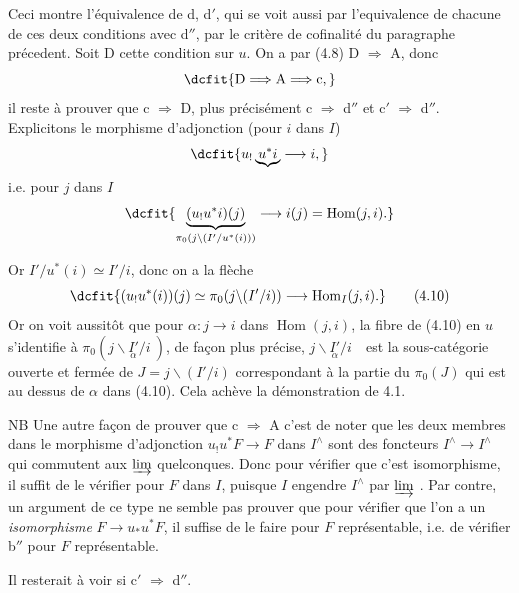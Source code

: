 \documentclass[11pt]{article}
\newcommand{\printedpage}[1]{\marginpar{\footnotesize p.~#1}}
\def\dcprintedpending{}
\newcommand{\msp}[1]{\marginpar{\footnotesize\raggedright
  \ifx\dcprintedpending\empty\else p.~\dcprintedpending\par\fi
  [#1]}\gdef\dcprintedpending{}}
\newcommand{\Hom}{\operatorname{Hom}}
\begin{document}
\printedpage{34}
Ceci montre l'équivalence de d, d$'$, qui se voit aussi par l'equivalence de chacune de ces deux conditions avec d$''$, par le critère de cofinalité du paragraphe précedent. Soit D cette condition sur $u$. On a par (4.8) D $\Longrightarrow$ A, donc %
\[
\dcfit{\mathrm{D} \Longrightarrow \mathrm{A} \Longrightarrow \mathrm{c},
}
\]
il reste à prouver que c $\Longrightarrow$ D, plus précisément c $\Longrightarrow$ d$''$ et c$'$ $\Longrightarrow$ d$''$. Explicitons le morphisme d'adjonction (pour $i$ dans $I$)
\[
\dcfit{u_!\underbrace{u^*i} \longrightarrow i,
}
\]
i.e. pour $j$ dans $I$
\[
\dcfit{\underbrace{(u_!u^*i)(j)}_{\pi_0(j\backslash(I'/u^*(i)))} \longrightarrow i(j) = \Hom(j,i).
}
\]

\msp{page 54}Or $I'/u^*(i) \simeq I'/i$, donc on a la flèche
\[
\dcfit{(u_!u^*(i))(j) \simeq \pi_0(j\backslash(I'/i)) \longrightarrow \Hom_I(j,i).
}
\tag*{(4.10)}
\]
Or on voit aussitôt que pour $\alpha : j \longrightarrow i$ dans $\Hom(j,i)$, la fibre de (4.10) en $u$ s'identifie à $\pi_0(j\backslash\underset{\alpha}{I'}/i\ )$, de façon plus précise, $j\backslash\underset{\alpha}{I'}/i$\ \ est la sous-catégorie ouverte et fermée de $J = j\backslash(I'/i)$ correspondant à la partie du $\pi_0(J)$ qui est au dessus de $\alpha$ dans (4.10). Cela achève la démonstration de 4.1.

NB Une autre façon de prouver que c $\Longrightarrow$ A c'est de noter que les deux membres dans le morphisme d'adjonction $u_!u^*F \longrightarrow F$ dans $I^{\wedge}$ sont des foncteurs $I^{\wedge} \longrightarrow I^{\wedge}$ qui commutent aux $\varinjlim$ quelconques. Donc pour vérifier que c'est isomorphisme, il suffit de le vérifier pour $F$ dans $I$, puisque $I$ engendre $I^{\wedge}$ par $\varinjlim$ . Par contre, un argument de ce type ne semble pas prouver que pour vérifier que l'on a un \textit{isomorphisme} $F \longrightarrow u_*u^*F$, il suffise de le faire pour $F$ représentable, i.e. de vérifier b$''$ pour $F$ représentable.

Il resterait à voir si c$'$ $\Longrightarrow$ d$''$.
\end{document}
